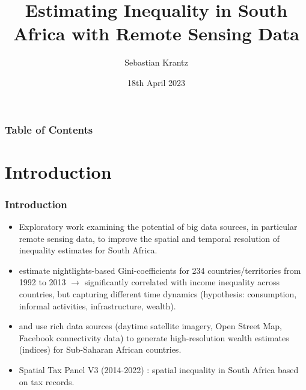 \documentclass[compress,xcolor=dvipsnames]{beamer}
\title[Remote Sensing Inequality in South Africa]{\textbf{Estimating Inequality in South Africa with Remote Sensing Data}} %
\author{Sebastian Krantz} %
\institute[Kiel Institute for the World Economy]
{
Kiel Institute for the World Economy\\ %
\bigskip
}
\date{18th April 2023} %
\newenvironment{noheadline}{
    \setbeamertemplate{headline}{}
    \addtobeamertemplate{frametitle}{\vspace*{-0.9\baselineskip}}{}
}{}
\begin{document}
\begin{noheadline}
\begin{frame} 
\titlepage 
\end{frame}


\begin{frame}
\frametitle{Table of Contents}
\tableofcontents
\end{frame}


\section{Introduction}

\begin{frame}
\frametitle{Introduction}
\begin{itemize}
\item Exploratory work examining the potential of big data sources, in particular remote sensing data, to improve the spatial and temporal resolution of inequality estimates for South Africa. 
\item \citet{galimberti2021measuring} estimate nightlights-based Gini-coefficients for 234 countries/territories from 1992 to 2013 $\to$ significantly correlated with income inequality across countries, but capturing different time dynamics (hypothesis: consumption, informal activities, infrastructure, wealth).
\item \citet{lee2022high} and \citet{chi2022microestimates} use rich data sources (daytime satellite imagery, Open Street Map, Facebook connectivity data) to generate high-resolution wealth estimates (indices) for Sub-Saharan African countries.
\item Spatial Tax Panel V3 (2014-2022) \citep{STP3}: spatial inequality in South Africa based on tax records. 
\end{itemize}
\end{frame}
\end{noheadline}
\end{document}
